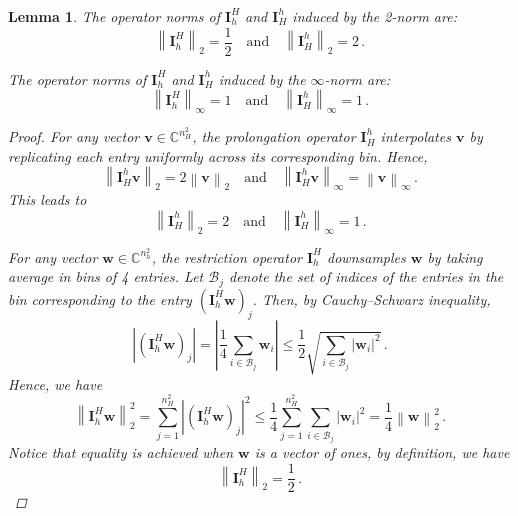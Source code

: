 \documentclass{article}
\numberwithin{equation}{section}
\newtheorem{lemma}[theorem]{Lemma}     %
\begin{document}
\begin{lemma}\label{lem:operator_norm}
The operator norms of $\bm{I}_h^H$ and $\bm{I}_H^h$ induced by the 2-norm are:
\begin{equation*}
   \left\|\bm{I}_h^H\right\|_2=\frac{1}{2}\quad\text{and}\quad\left\|\bm{I}_H^h\right\|_2=2\,.
\end{equation*}

The operator norms of $\bm{I}_h^H$ and $\bm{I}_H^h$ induced by the $\infty$-norm are:
\begin{equation*}
   \left\|\bm{I}_h^H\right\|_\infty=1\quad\text{and}\quad\left\|\bm{I}_H^h\right\|_\infty=1\,.
\end{equation*}
    \begin{proof}
       For any vector $\bm{v}\in \mathbb{C}^{n_H^2}$, the prolongation operator $\bm{I}_H^h$ interpolates $\bm{v}$ by replicating each entry uniformly across its corresponding bin. Hence, 
    \begin{equation*}
        \left\|\bm{I}_H^h\bm{v}\right\|_2=2\left\|\bm{v}\right\|_2\quad\text{and}\quad\left\|\bm{I}_H^h\bm{v}\right\|_\infty=\left\|\bm{v}\right\|_\infty\,.
    \end{equation*}
       This leads to 
    \begin{equation*}
        \left\|\bm{I}_H^h\right\|_2=2\quad\text{and}\quad\left\|\bm{I}_H^h\right\|_\infty=1\,.
    \end{equation*}
    

    For any vector $\bm{w}\in \mathbb{C}^{n_h^2}$, the restriction operator $\bm{I}_h^H$ downsamples $\bm{w}$ by taking average in bins of 4 entries. Let $\mathcal{B}_j$ denote the set of indices of the entries in the bin corresponding to the entry $\left(\bm{I}_h^H\bm{w}\right)_j$.  Then, by Cauchy–Schwarz inequality, 
    \begin{equation*}
         \left|\left(\bm{I}_h^H\bm{w}\right)_j\right| = \left|\frac{1}{4}\sum_{i\in\mathcal{B}_j}\bm{w}_i\right|\leq \frac{1}{2}\sqrt{\sum_{i\in\mathcal{B}_j}|\bm{w}_i|^2}\,.
    \end{equation*}   
    Hence, we have
    \begin{equation*}
        \left\|\bm{I}_h^H\bm{w}\right\|_2^2 = \sum_{j=1}^{n_H^2} \left|\left(\bm{I}_h^H\bm{w}\right)_j\right|^2
        \leq \frac{1}{4}\sum_{j=1}^{n_H^2}\sum_{i\in\mathcal{B}_j}|\bm{w}_i|^2
        = \frac{1}{4}\left\|\bm{w}\right\|_2^2\,.
    \end{equation*}
    Notice that equality is achieved when $\bm{w}$ is a vector of ones, by definition, we have
    \begin{equation*}
        \left\|\bm{I}_h^H\right\|_2=\frac{1}{2}\,.
    \end{equation*}
    

\end{proof}
\end{lemma}
\end{document}
